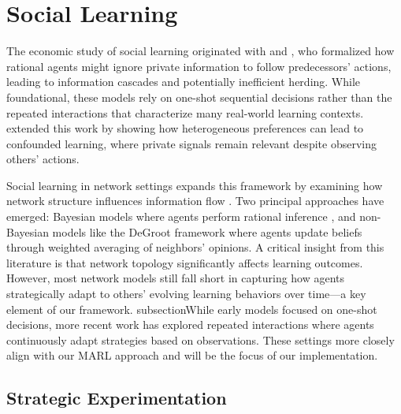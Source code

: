 \documentclass[a4paper,12pt]{report}
\begin{document}
\section{Social Learning}
The economic study of social learning originated with \citet{banerjee1992simple} and \citet{bikhchandani1992theory}, who formalized how rational agents might ignore private information to follow predecessors' actions, leading to information cascades and potentially inefficient herding. While foundational, these models rely on one-shot sequential decisions rather than the repeated interactions that characterize many real-world learning contexts. \citet{smith2000pathological} extended this work by showing how heterogeneous preferences can lead to confounded learning, where private signals remain relevant despite observing others' actions.

Social learning in network settings expands this framework by examining how network structure influences information flow \citep{acemoglu2011bayesian, golub2010naive}. Two principal approaches have emerged: Bayesian models where agents perform rational inference \citep{rosenberg2009informational, gale2003bayesian,mossel2015strategic}, and non-Bayesian models \citep{golub2010naive, demarzo2003persuasion} like the DeGroot framework \citep{degroot1974reaching} where agents update beliefs through weighted averaging of neighbors' opinions. A critical insight from this literature is that network topology significantly affects learning outcomes. However, most network models still fall short in capturing how agents strategically adapt to others' evolving learning behaviors over time—a key element of our framework. subsectionWhile early models focused on one-shot decisions, more recent work has explored repeated interactions where agents continuously adapt strategies based on observations. These settings more closely align with our MARL approach and will be the focus of our implementation.

\subsection{Strategic Experimentation}
\end{document}
